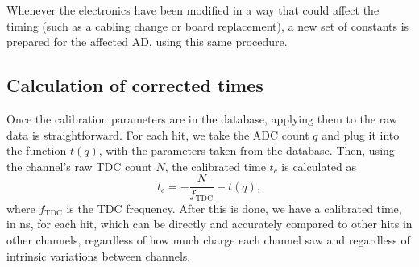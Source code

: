 \documentclass[../thesis.tex]{subfiles}
\begin{document}
Whenever the electronics have been modified in a way that could affect the timing (such as a cabling change or board replacement), a new set of constants is prepared for the affected AD, using this same procedure.

\begin{comment}
Show the tof-corrected times; comment on TDC discretization.
\end{comment}

\subsection{Calculation of corrected times}

Once the calibration parameters are in the database, applying them to the raw data is straightforward. For each hit, we take the ADC count $q$ and plug it into the function $t(q)$, with the parameters taken from the database. Then, using the channel's raw TDC count $N$, the calibrated time $t_c$ is calculated as
\[ t_c = -\frac{N}{f_\mathrm{TDC}} - t(q), \]
where $f_\mathrm{TDC}$ is the TDC frequency. After this is done, we have a calibrated time, in ns, for each hit, which can be directly and accurately compared to other hits in other channels, regardless of how much charge each channel saw and regardless of intrinsic variations between channels.
\end{document}
